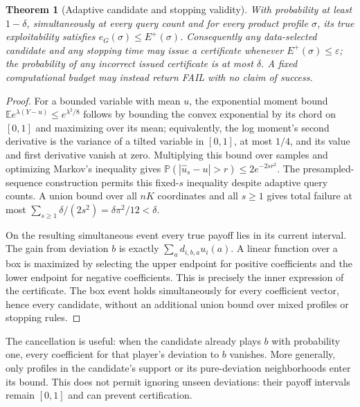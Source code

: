 \documentclass[11pt]{article}
\newtheorem{theorem}{Theorem}
\theoremstyle{remark}\newtheorem{remark}[theorem]{Remark}
\newcommand{\E}{\mathbb E}
\newcommand{\Prb}{\mathbb P}
\begin{document}
\begin{theorem}[Adaptive candidate and stopping validity]
With probability at least $1-\delta$, simultaneously at every query count and for every product profile $\sigma$, its true exploitability satisfies $e_G(\sigma)\le E^+(\sigma)$. Consequently any data-selected candidate and any stopping time may issue a certificate whenever $E^+(\sigma)\le\varepsilon$; the probability of any incorrect issued certificate is at most $\delta$. A fixed computational budget may instead return FAIL with no claim of success.
\end{theorem}
\begin{proof}
For a bounded variable with mean $u$, the exponential moment bound $\E e^{\lambda(Y-u)}\le e^{\lambda^2/8}$ follows by bounding the convex exponential by its chord on $[0,1]$ and maximizing over its mean; equivalently, the log moment's second derivative is the variance of a tilted variable in $[0,1]$, at most $1/4$, and its value and first derivative vanish at zero. Multiplying this bound over samples and optimizing Markov's inequality gives
$\Prb(|\widehat u_s-u|>r)\le2e^{-2sr^2}$.
The presampled-sequence construction permits this fixed-$s$ inequality despite adaptive query counts. A union bound over all $nK$ coordinates and all $s\ge1$ gives total failure at most
$\sum_{s\ge1}\delta/(2s^2)=\delta\pi^2/12<\delta$.

On the resulting simultaneous event every true payoff lies in its current interval. The gain from deviation $b$ is exactly $\sum_a d_{i,b,a}u_i(a)$. A linear function over a box is maximized by selecting the upper endpoint for positive coefficients and the lower endpoint for negative coefficients. This is precisely the inner expression of the certificate. The box event holds simultaneously for every coefficient vector, hence every candidate, without an additional union bound over mixed profiles or stopping rules.
\end{proof}

The cancellation is useful: when the candidate already plays $b$ with probability one, every coefficient for that player's deviation to $b$ vanishes. More generally, only profiles in the candidate's support or its pure-deviation neighborhoods enter its bound. This does not permit ignoring unseen deviations: their payoff intervals remain $[0,1]$ and can prevent certification.
\end{document}
